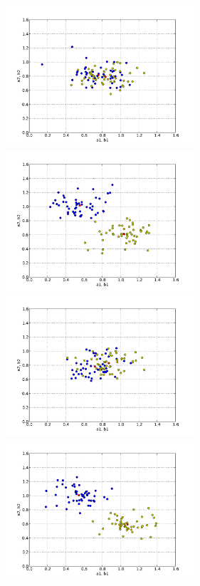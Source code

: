 \begin{figure}
  \begin{center}
    \includegraphics[width=7cm]{chapters/schroll/pdf/4Dsample1-5.pdf}
    \includegraphics[width=7cm]{chapters/schroll/pdf/4Dsample1b-5.pdf}
    \includegraphics[width=7cm]{chapters/schroll/pdf/4Dsample2-5.pdf}
    \includegraphics[width=7cm]{chapters/schroll/pdf/4Dsample2b-5.pdf}

\end{center}
\end{figure}
